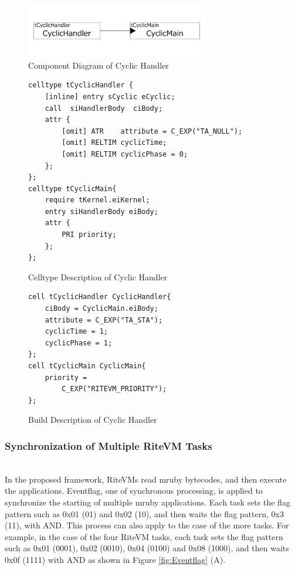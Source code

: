 \documentclass[conference,compsoc]{IEEEtran}
\begin{document}
\begin{figure}[t]
    \centering
    \includegraphics[width=8cm,clip]{figure/cyclic_handler.pdf}
    \caption{Component Diagram of Cyclic Handler}
    \label{fig:cyclic_handler}
\end{figure}
\begin{figure}[t]
    \centering
    \begin{lstlisting}
celltype tCyclicHandler {
    [inline] entry sCyclic eCyclic;
    call  siHandlerBody  ciBody;
    attr {
    	[omit] ATR    attribute = C_EXP("TA_NULL");
    	[omit] RELTIM cyclicTime;
    	[omit] RELTIM cyclicPhase = 0;
    };
};
celltype tCyclicMain{
    require tKernel.eiKernel;
    entry siHandlerBody eiBody;
    attr {
        PRI priority;
    };
};
    \end{lstlisting}
    \caption{Celltype Description of Cyclic Handler}
    \label{celltype_cyclic_handler}
\end{figure}
\begin{figure}[t]
    \centering
    \begin{lstlisting}
cell tCyclicHandler CyclicHandler{
    ciBody = CyclicMain.eiBody;
    attribute = C_EXP("TA_STA");
    cyclicTime = 1;
    cyclicPhase = 1;
};
cell tCyclicMain CyclicMain{
    priority =
        C_EXP("RITEVM_PRIORITY");
};
   \end{lstlisting}
    \caption{Build Description of Cyclic Handler}
    \label{build_cyclic_handler}
\end{figure}
 
\subsubsection{Synchronization of Multiple RiteVM Tasks} \mbox{}\\

In the proposed framework, RiteVMs read mruby bytecodes, and then execute the applications.
Eventflag, one of synchronous processing, is applied to synchronize the starting of multiple mruby applications.
Each task sets the flag pattern such as 0x01 (01) and 0x02 (10), and then waits the flag pattern, 0x3 (11), with AND.
This process can also apply to the case of the more tasks.
For example, in the case of the four RiteVM tasks, each task sets the flag pattern such as 0x01 (0001), 0x02 (0010), 0x04 (0100)  and 0x08 (1000), and then waits 0x0f (1111) with AND as shown in Figure \ref{fig:Eventflag} (A).
\end{document}
